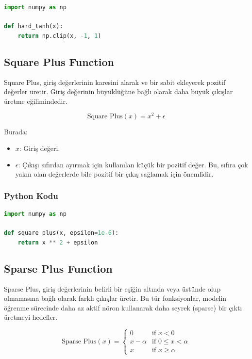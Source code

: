 \begin{lstlisting}[language=Python]
import numpy as np

def hard_tanh(x):
    return np.clip(x, -1, 1)
\end{lstlisting}

\newpage

\subsection{Square Plus Function}

Square Plus, giriş değerlerinin karesini alarak ve bir sabit ekleyerek pozitif değerler üretir. Giriş değerinin büyüklüğüne bağlı olarak daha büyük çıkışlar üretme eğilimindedir.

\[ \text{Square Plus}(x) = x^2 + \epsilon \]

Burada:

\begin{itemize}
    \item $x$: Giriş değeri.
    \item $\epsilon$: Çıkışı sıfırdan ayırmak için kullanılan küçük bir pozitif değer. Bu, sıfıra çok yakın olan değerlerde bile pozitif bir çıkış sağlamak için önemlidir.
\end{itemize}

\subsubsection{Python Kodu}

\begin{lstlisting}[language=Python]
import numpy as np

def square_plus(x, epsilon=1e-6):
    return x ** 2 + epsilon
\end{lstlisting}

\newpage

\subsection{Sparse Plus Function}

Sparse Plus, giriş değerlerinin belirli bir eşiğin altında veya üstünde olup olmamasına bağlı olarak farklı çıkışlar üretir. Bu tür fonksiyonlar, modelin öğrenme sürecinde daha az aktif nöron kullanarak daha seyrek (sparse) bir çıktı üretmeyi hedefler.

\[
\text{Sparse Plus}(x) = 
\begin{cases} 
0 & \text{if } x < 0 \\ 
x - \alpha & \text{if } 0 \leq x < \alpha \\ 
x & \text{if } x \geq \alpha 
\end{cases}
\]

